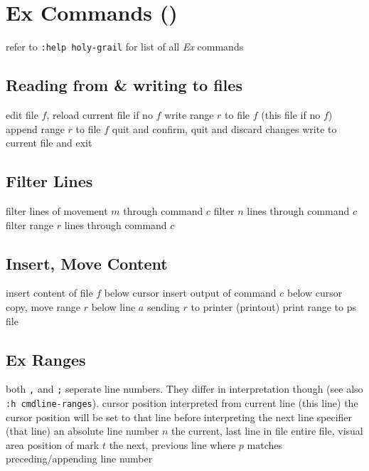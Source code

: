 \vskip -0.2cm
\section{Ex Commands (\enter)}	{refer to {\tt :help holy-grail} for list of all {\it Ex\/} commands}
\subsection{Reading from \& writing to files}	{}
	{edit file $f$, reload current file if no $f$}
	{write range $r$ to file $f$ (this file if no $f$)}
	{append range $r$ to file $f$}
	{quit and confirm, quit and discard changes}
	{write to current file and exit}

\subsection{Filter Lines}{}
	{filter lines of movement $m$ through command $c$}
	{filter $n$ lines through command $c$}
	{filter range $r$ lines through command $c$}

\subsection{Insert, Move Content}	{}
	{insert content of file $f$ below cursor}
	{insert output of command $c$ below cursor}
	{copy, move range $r$ below line $a$}
	{sending $r$ to printer (printout)}
	{print range to ps file}

\subsection{Ex Ranges}	{both {\tt ,} and {\tt ;} seperate line numbers. They differ in interpretation though (see also {\tt :h cmdline-ranges}).}
\cmdOper{, }	{cursor position interpreted from current line (this line)}
\cmdOper{;\ }	{the cursor position will be set to that line before interpreting the next line specifier (that line)}
	{an absolute line number $n$}
	{the current, last line in file}
\cmdOper{\% * }	{entire file, visual area}
	{position of mark $t$}
	{the next, previous line where $p$ matches}
	{preceding/appending line number}

